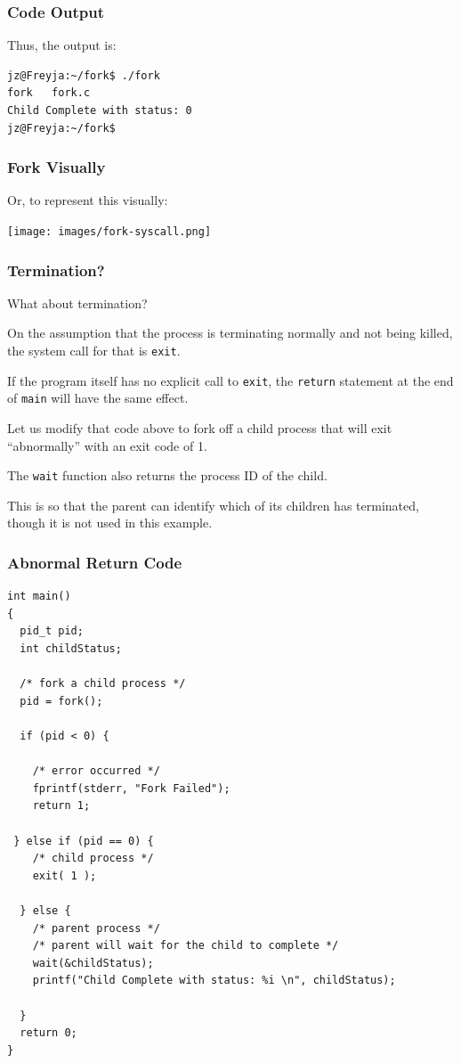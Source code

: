 \begin{frame}[fragile]
\frametitle{Code Output}

Thus, the output is:
\begin{verbatim}
jz@Freyja:~/fork$ ./fork 
fork   fork.c
Child Complete with status: 0
jz@Freyja:~/fork$ 
\end{verbatim}


\end{frame}

\begin{frame}
\frametitle{Fork Visually}

Or, to represent this visually:

\begin{center}
\texttt{[image: images/fork-syscall.png]}
\end{center}

\end{frame}

\begin{frame}
\frametitle{Termination?}

What about termination? 

On the assumption that the process is terminating normally and not being killed, the system call for that is \texttt{exit}. 

If the program itself has no explicit call to \texttt{exit}, the \texttt{return} statement at the end of \texttt{main} will have the same effect.

Let us modify that code above to fork off a child process that will exit ``abnormally'' with an exit code of 1. 

The \texttt{wait} function also returns the process ID of the child.

 This is so that the parent can identify which of its children has terminated, though it is not used in this example.

\end{frame}

\begin{frame}[fragile]
\frametitle{Abnormal Return Code}
{\scriptsize
\begin{verbatim}
int main()
{
  pid_t pid;
  int childStatus;

  /* fork a child process */
  pid = fork();
  
  if (pid < 0) { 
  
    /* error occurred */ 
    fprintf(stderr, "Fork Failed"); 
    return 1;
    
 } else if (pid == 0) {  
    /* child process */
    exit( 1 );
    
  } else {
    /* parent process */
    /* parent will wait for the child to complete */
    wait(&childStatus);
    printf("Child Complete with status: %i \n", childStatus);
    
  }   
  return 0;
}
\end{verbatim}

}

\end{frame}


